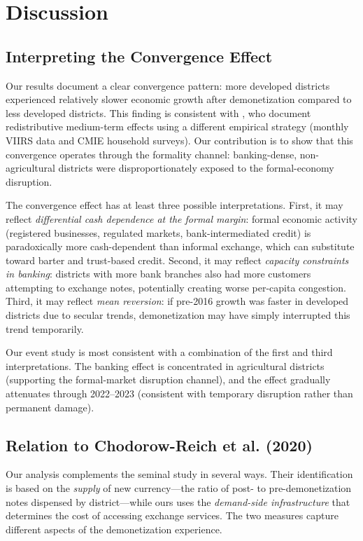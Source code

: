 \documentclass[12pt]{article}
\begin{document}
\section{Discussion}\label{sec:discussion}

\subsection{Interpreting the Convergence Effect}

Our results document a clear convergence pattern: more developed districts experienced relatively slower economic growth after demonetization compared to less developed districts. This finding is consistent with \citet{chanda2022was}, who document redistributive medium-term effects using a different empirical strategy (monthly VIIRS data and CMIE household surveys). Our contribution is to show that this convergence operates through the formality channel: banking-dense, non-agricultural districts were disproportionately exposed to the formal-economy disruption.

The convergence effect has at least three possible interpretations. First, it may reflect \textit{differential cash dependence at the formal margin}: formal economic activity (registered businesses, regulated markets, bank-intermediated credit) is paradoxically more cash-dependent than informal exchange, which can substitute toward barter and trust-based credit. Second, it may reflect \textit{capacity constraints in banking}: districts with more bank branches also had more customers attempting to exchange notes, potentially creating worse per-capita congestion. Third, it may reflect \textit{mean reversion}: if pre-2016 growth was faster in developed districts due to secular trends, demonetization may have simply interrupted this trend temporarily.

Our event study is most consistent with a combination of the first and third interpretations. The banking effect is concentrated in agricultural districts (supporting the formal-market disruption channel), and the effect gradually attenuates through 2022--2023 (consistent with temporary disruption rather than permanent damage).

\subsection{Relation to Chodorow-Reich et al. (2020)}

Our analysis complements the seminal \citet{chodorow2020cash} study in several ways. Their identification is based on the \textit{supply} of new currency---the ratio of post- to pre-demonetization notes dispensed by district---while ours uses the \textit{demand-side infrastructure} that determines the cost of accessing exchange services. The two measures capture different aspects of the demonetization experience.
\end{document}
